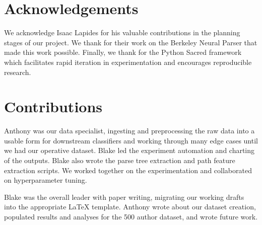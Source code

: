 \documentclass[11pt,a4paper]{article}
\begin{document}
\section*{Acknowledgements}

We acknowledge Isaac Lapides for his valuable contributions in the planning stages of our project. We thank \citeauthor{Kitaev-2018-SelfAttentive} for their work on the Berkeley Neural Parser that made this work possible. Finally, we thank \citeauthor{klaus_greff-proc-scipy-2017} for the Python Sacred framework which facilitates rapid iteration in experimentation and encourages reproducible research.



\section*{Contributions}

Anthony was our data specialist, ingesting and preprocessing the raw data into a usable form for downstream classifiers and working through many edge cases until we had our operative dataset. Blake led the experiment automation and charting of the outputs. Blake also wrote the parse tree extraction and path feature extraction scripts. We worked together on the experimentation and collaborated on hyperparameter tuning.

Blake was the overall leader with paper writing, migrating our working drafts into the appropriate \LaTeX{} template. Anthony wrote about our dataset creation, populated results and analyses for the 500 author dataset, and wrote future work. 
\end{document}
